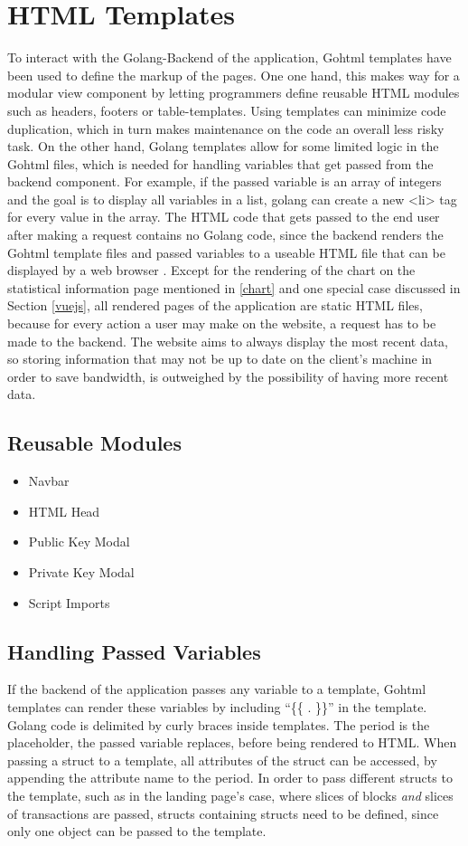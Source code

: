 \section{HTML Templates}
To interact with the Golang-Backend of the application, Gohtml templates \cite{template} have been used to define the markup of the pages. One one hand, this makes way for a modular view component by letting programmers define reusable HTML modules such as headers, footers or table-templates. Using templates can minimize code duplication, which in turn makes maintenance on the code an overall less risky task. On the other hand, Golang templates allow for some limited logic in the Gohtml files, which is needed for handling variables that get passed from the backend component. For example, if the passed variable is an array of integers and the goal is to display all variables in a list, golang can create a new <li> tag for every value in the array. The HTML code that gets passed to the end user after making a request contains no Golang code, since the backend renders the Gohtml template files and passed variables to a useable HTML file that can be displayed by a web browser \cite{httppackage}. Except for the rendering of the chart on the statistical information page mentioned in \ref{chart} and one special case discussed in Section \ref{vuejs}, all rendered pages of the application are static HTML files, because for every action a user may make on the website, a request has to be made to the backend. The website aims to always display the most recent data, so storing information that may not be up to date on the client's machine in order to save bandwidth, is outweighed by the possibility of having more recent data. 

\subsection{Reusable Modules}
\begin{itemize}
\item{Navbar}
\item{HTML Head}
\item{Public Key Modal}
\item{Private Key Modal}
\item{Script Imports}
\end{itemize}

\subsection{Handling Passed Variables}
If the backend of the application passes any variable to a template, Gohtml templates can render these variables by including ``\{\{ . \}\}'' in the template. Golang code is delimited by curly braces inside templates. The period is the placeholder, the passed variable replaces, before being rendered to HTML. When passing a struct to a template, all attributes of the struct can be accessed, by appending the attribute name to the period. In order to pass different structs to the template, such as in the landing page's case, where slices of blocks \emph{and} slices of transactions are passed, structs containing structs need to be defined, since only one object can be passed to the template. 

